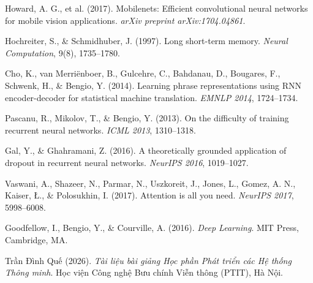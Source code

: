 \documentclass[12pt,a4paper]{report}
\begin{document}
\begin{enumerate}[leftmargin=1.5cm, label={[\arabic*]}]
    \item Howard, A. G., et al. (2017). Mobilenets: Efficient convolutional neural networks for mobile vision applications. \textit{arXiv preprint arXiv:1704.04861}.
    \item Hochreiter, S., \& Schmidhuber, J. (1997). Long short-term memory. \textit{Neural Computation}, 9(8), 1735--1780.
    \item Cho, K., van Merriënboer, B., Gulcehre, C., Bahdanau, D., Bougares, F., Schwenk, H., \& Bengio, Y. (2014). Learning phrase representations using RNN encoder-decoder for statistical machine translation. \textit{EMNLP 2014}, 1724--1734.
    \item Pascanu, R., Mikolov, T., \& Bengio, Y. (2013). On the difficulty of training recurrent neural networks. \textit{ICML 2013}, 1310--1318.
    \item Gal, Y., \& Ghahramani, Z. (2016). A theoretically grounded application of dropout in recurrent neural networks. \textit{NeurIPS 2016}, 1019--1027.
    \item Vaswani, A., Shazeer, N., Parmar, N., Uszkoreit, J., Jones, L., Gomez, A. N., Kaiser, Ł., \& Polosukhin, I. (2017). Attention is all you need. \textit{NeurIPS 2017}, 5998--6008.
    \item Goodfellow, I., Bengio, Y., \& Courville, A. (2016). \textit{Deep Learning}. MIT Press, Cambridge, MA.
    \item Trần Đình Quế (2026). \textit{Tài liệu bài giảng Học phần Phát triển các Hệ thống Thông minh}. Học viện Công nghệ Bưu chính Viễn thông (PTIT), Hà Nội.
\end{enumerate}
\end{document}

